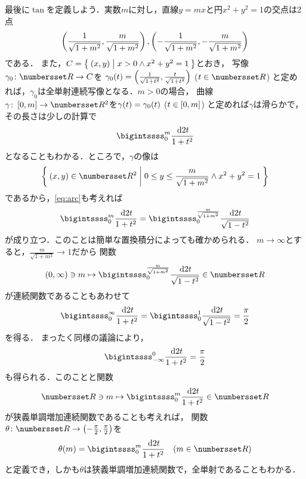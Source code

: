 \documentclass[11pt,a4paper]{ltjsarticle}
\newcommand*{\coord}[1]{\paren{#1}}
\newcommand*{\maparrow}{\rightarrow}
\newcommand*{\intd}{\dl2}
\theoremstyle{definition}
\begin{document}
最後に$\tan$を定義しよう．実数$m$に対し，直線$y = mx$と円$x^2 + y^2 = 1$の交点は2点
\begin{align}
  \coord{\frac{1}{\sqrt{1 + m^2}}, \frac{m}{\sqrt{1 + m^2}}},
  \coord{- \frac{1}{\sqrt{1 + m^2}}, - \frac{m}{\sqrt{1 + m^2}}}
  \label{eq:crosspoint}
\end{align}
である．
また，$C = \setintension{\coord{x,y}}{x > 0 \land x^2 + y^2 = 1}$とおき，
写像$\gamma_0 \colon \Real \maparrow C$を
$\apply{\gamma_0}{t} = \coord{\frac{1}{\sqrt{1 + t^2}}, \frac{t}{\sqrt{1 + t^2}}}$ ($t \in \Real$)
と定めれば，$\gamma_0$は全単射連続写像となる．$m > 0$の場合，
曲線$\gamma \colon \interval{c}{0,m} \maparrow \Real^2$を$\apply{\gamma}{t} = \apply{\gamma_0}{t}$ ($t \in \interval{c}{0,m}$)
と定めれば$\gamma$は滑らかで，その長さは少しの計算で
\begin{align}
  \bigintssss_0^m \frac{\intd t}{1 + t^2}
  \label{eq:arctan}
\end{align}
となることもわかる．ところで，$\gamma$の像は
\[
  \setintension{\coord{x,y} \in \Real^2}{0 \leq y \leq \frac{m}{\sqrt{1 + m^2}} \land x^2 + y^2 = 1}
\]
であるから，\cref{eq:arc}も考えれば
\begin{align}
  \bigintssss_0^m \frac{\intd t}{1 + t^2} = \bigintssss_0^{\frac{m}{\sqrt{1 + m^2}}} \frac{\intd t}{\sqrt{1 - t^2}}
  \label{eq:angle}
\end{align}
が成り立つ．このことは簡単な置換積分によっても確かめられる．
$m \to \infty$とすると，$\frac{m}{\sqrt{1 + m^2}} \to 1$だから
関数
\[
  \interval{op}{0,\infty} \ni m \mapsto \bigintssss_0^{\frac{m}{\sqrt{1 + m^2}}} \frac{\intd t}{\sqrt{1 - t^2}} \in \Real
\]
が連続関数であることもあわせて
\begin{align}
  \bigintssss_0^{\infty} \frac{\intd t}{1 + t^2} = \bigintssss_0^1 \frac{\intd t}{\sqrt{1 - t^2}} = \frac{\pi}{2}
  \label{eq:piint}
\end{align}
を得る．
まったく同様の議論により，
\begin{align}
  \bigintssss_{-\infty}^0 \frac{\intd t}{1 + t^2} = \frac{\pi}{2}
  \label{eq:piint2}
\end{align}
も得られる．このことと関数
\begin{align*}
  \Real \ni m \mapsto \bigintssss_0^m \frac{\intd t}{1 + t^2} \in \Real
\end{align*}
が狭義単調増加連続関数であることも考えれば，
関数$\theta \colon \Real \maparrow \interval{op}{-\frac{\pi}{2}, \frac{\pi}{2}}$を
\begin{align}
  \apply{\theta}{m} = \bigintssss_0^m \frac{\intd t}{1 + t^2} \quad \text{($m \in \Real$)}
  \label{eq:arctan}
\end{align}
と定義でき，しかも$\theta$は狭義単調増加連続関数で，全単射であることもわかる．
\end{document}

